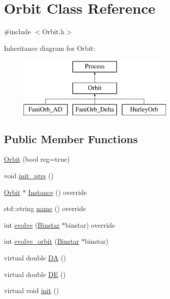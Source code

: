 \hypertarget{class_orbit}{}\section{Orbit Class Reference}
\label{class_orbit}


{\ttfamily \#include $<$Orbit.\+h$>$}

Inheritance diagram for Orbit\+:\begin{figure}[H]
\begin{center}
\leavevmode
\includegraphics[height=3.000000cm]{class_orbit}
\end{center}
\end{figure}
\subsection*{Public Member Functions}
\begin{DoxyCompactItemize}
\item 
\hyperlink{class_orbit_af2f3481e19182fd2913fede508e0c685}{Orbit} (bool reg=true)
\item 
void \hyperlink{class_orbit_adc6b998a131e9576ee1723b60f4e614f}{init\+\_\+ptrs} ()
\item 
\hyperlink{class_orbit}{Orbit} $\ast$ \hyperlink{class_orbit_a814a77820afd104edbd08f955b123cb4}{Instance} () override
\item 
std\+::string \hyperlink{class_orbit_a37095e757de4e80b3a49ad8c03335568}{name} () override
\item 
int \hyperlink{class_orbit_a772b9fe9a4718147236f4cb52cf268da}{evolve} (\hyperlink{class_binstar}{Binstar} $\ast$binstar) override
\item 
int \hyperlink{class_orbit_a618bf7f4226380f7b483343734aa347e}{evolve\+\_\+orbit} (\hyperlink{class_binstar}{Binstar} $\ast$binstar)
\item 
virtual double \hyperlink{class_orbit_a258deda1207d23b2ce6285b55e216d4f}{DA} ()
\item 
virtual double \hyperlink{class_orbit_a9bac8077719791b75d0c962428f8e1b4}{DE} ()
\item 
virtual void \hyperlink{class_orbit_ab92aeb9474f9aa26ea000ed2ea8c2c8c}{init} ()
\end{DoxyCompactItemize}
